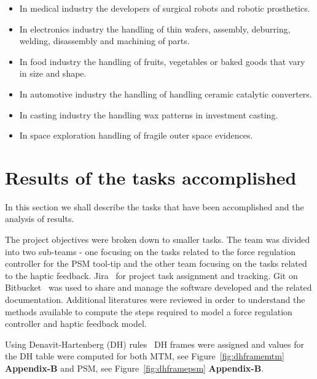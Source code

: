 \documentclass[10pt,journal,compsoc]{IEEEtran}
\begin{document}
\begin{itemize}
\item In medical industry the developers of surgical robots and robotic prosthetics.
\item In electronics industry the handling of thin wafers, assembly, deburring, welding, disassembly and machining of parts.
\item In food industry the handling of fruits, vegetables or baked goods that vary in size and shape.
\item In automotive industry the handling of handling ceramic catalytic converters.
\item In casting industry the handling wax patterns in investment casting.
\item In space exploration handling of fragile outer space evidences.
\end{itemize}

\section{Results of the tasks accomplished}
In this section we shall describe the tasks that have been accomplished and the analysis of results.

The project objectives were broken down to smaller tasks. The team was divided into two sub-teams - one focusing on the tasks related to the force regulation controller for the PSM tool-tip and the other team focusing on the tasks related to the haptic feedback. Jira~\cite{jira} for project task assignment and tracking. Git on Bitbucket~\cite{bitbucket} was used to share and manage the software developed and the related documentation.
Additional literatures were reviewed in order to understand the methods available to compute the steps required to model a force regulation controller and haptic feedback model.

Using Denavit-Hartenberg (DH) rules~\cite{denavit1955} DH frames were assigned and values for the DH table were computed for both MTM, see Figure~\ref{fig:dhframemtm}  \textbf{Appendix-B} and PSM, see Figure~\ref{fig:dhframepsm} \textbf{Appendix-B}.
\end{document}
